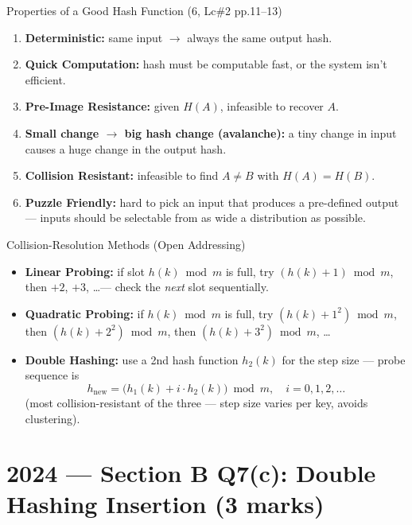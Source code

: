 \documentclass[12pt,a4paper]{article}
\begin{document}
\begin{keybox}{Properties of a Good Hash Function (6, Lc\#2 pp.11--13)}
\begin{enumerate}[noitemsep]
  \item \textbf{Deterministic:} same input $\to$ always the same output hash.
  \item \textbf{Quick Computation:} hash must be computable fast, or the system isn't efficient.
  \item \textbf{Pre-Image Resistance:} given $H(A)$, infeasible to recover $A$.
  \item \textbf{Small change $\to$ big hash change (avalanche):} a tiny change in input causes a huge change in the output hash.
  \item \textbf{Collision Resistant:} infeasible to find $A \neq B$ with $H(A)=H(B)$.
  \item \textbf{Puzzle Friendly:} hard to pick an input that produces a pre-defined output --- inputs should be selectable from as wide a distribution as possible.
\end{enumerate}
\end{keybox}

\begin{algobox}{Collision-Resolution Methods (Open Addressing)}
\begin{itemize}[noitemsep]
  \item \textbf{Linear Probing:} if slot $h(k) \bmod m$ is full, try $(h(k)+1)\bmod m$, then $+2$, $+3$, \dots --- check the \emph{next} slot sequentially.
  \item \textbf{Quadratic Probing:} if $h(k)\bmod m$ is full, try $(h(k)+1^2)\bmod m$, then $(h(k)+2^2)\bmod m$, then $(h(k)+3^2)\bmod m$, \dots
  \item \textbf{Double Hashing:} use a 2nd hash function $h_2(k)$ for the step size --- probe sequence is
  \[
  h_{\text{new}} = \big(h_1(k) + i \cdot h_2(k)\big) \bmod m, \quad i = 0, 1, 2, \dots
  \]
  (most collision-resistant of the three --- step size varies per key, avoids clustering).
\end{itemize}
\end{algobox}

\newpage
\section{2024 --- Section B Q7(c): Double Hashing Insertion (3 marks)}
\end{document}

